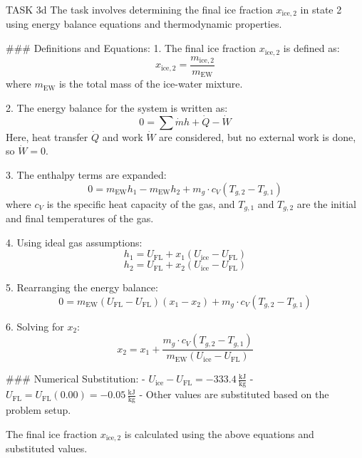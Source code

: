 TASK 3d  
The task involves determining the final ice fraction \( x_{\text{ice},2} \) in state 2 using energy balance equations and thermodynamic properties.

### Definitions and Equations:
1. The final ice fraction \( x_{\text{ice},2} \) is defined as:
   \[
   x_{\text{ice},2} = \frac{m_{\text{ice},2}}{m_{\text{EW}}}
   \]
   where \( m_{\text{EW}} \) is the total mass of the ice-water mixture.

2. The energy balance for the system is written as:
   \[
   0 = \sum \dot{m} h + \dot{Q} - \dot{W}
   \]
   Here, heat transfer \( \dot{Q} \) and work \( \dot{W} \) are considered, but no external work is done, so \( \dot{W} = 0 \).

3. The enthalpy terms are expanded:
   \[
   0 = m_{\text{EW}} h_1 - m_{\text{EW}} h_2 + m_g \cdot c_V (T_{g,2} - T_{g,1})
   \]
   where \( c_V \) is the specific heat capacity of the gas, and \( T_{g,1} \) and \( T_{g,2} \) are the initial and final temperatures of the gas.

4. Using ideal gas assumptions:
   \[
   h_1 = U_{\text{FL}} + x_1 (U_{\text{ice}} - U_{\text{FL}})
   \]
   \[
   h_2 = U_{\text{FL}} + x_2 (U_{\text{ice}} - U_{\text{FL}})
   \]

5. Rearranging the energy balance:
   \[
   0 = m_{\text{EW}} (U_{\text{FL}} - U_{\text{FL}}) (x_1 - x_2) + m_g \cdot c_V (T_{g,2} - T_{g,1})
   \]

6. Solving for \( x_2 \):
   \[
   x_2 = x_1 + \frac{m_g \cdot c_V (T_{g,2} - T_{g,1})}{m_{\text{EW}} (U_{\text{ice}} - U_{\text{FL}})}
   \]

### Numerical Substitution:
- \( U_{\text{ice}} - U_{\text{FL}} = -333.4 \, \frac{\text{kJ}}{\text{kg}} \)
- \( U_{\text{FL}} = U_{\text{FL}} (0.00) = -0.05 \, \frac{\text{kJ}}{\text{kg}} \)
- Other values are substituted based on the problem setup.

The final ice fraction \( x_{\text{ice},2} \) is calculated using the above equations and substituted values.